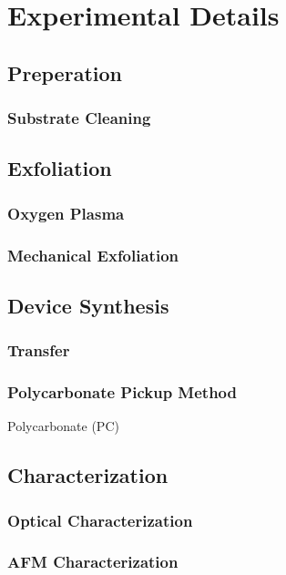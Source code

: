 \chapter{Experimental Details}\label{chap:exp_details}

\section{Preperation}\label{sec:sample_prep}
\subsection{Substrate Cleaning}\label{subsec:cleaning}

\section{Exfoliation}\label{sec:exfoliation}
\subsection{Oxygen Plasma}\label{subsec:o2plasma}
\subsection{Mechanical Exfoliation}\label{subsec:mech_exfoliation}

\section{Device Synthesis}\label{sec:synthesis}
\subsection{Transfer}\label{subsec:transfer}
\subsection{Polycarbonate Pickup Method}\label{subsec:pc_pickup}
Polycarbonate (PC)

\section{Characterization}\label{sec:characterization}
\subsection{Optical Characterization}\label{subsec:characterization_optical}
\subsection{AFM Characterization}\label{subsec:characterization_afm}


